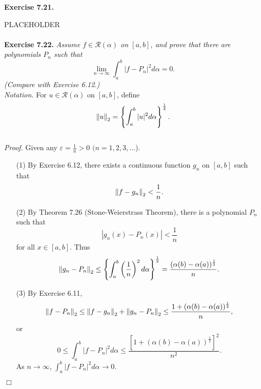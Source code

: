 \documentclass{article}
\begin{document}



\textbf{Exercise 7.21.}

PLACEHOLDER \\\\






\textbf{Exercise 7.22.}
\emph{Assume $f \in \mathscr{R}(\alpha)$ on $[a,b]$,
and prove that there are polynomials $P_n$ such that
\[
  \lim_{n \to \infty} \int_{a}^{b} |f-P_n|^2 d\alpha = 0.
\]
(Compare with Exercise 6.12.)} \\

\emph{Notation.}
For $u \in \mathscr{R}(\alpha)$ on $[a,b]$, define
  \[
    \norm{u}_2 = \left\{ \int_{a}^{b}|u|^2 d\alpha \right\}^{\frac{1}{2}}.
  \] \\

\emph{Proof.}
Given any $\varepsilon = \frac{1}{n} > 0$ $(n=1,2,3,\ldots$).
\begin{enumerate}
\item[(1)]
  By Exercise 6.12, there exists a continuous function $g_n$ on $[a,b]$
  such that
  \[
    \norm{f-g_n}_2 < \frac{1}{n}.
  \]

\item[(2)]
  By Theorem 7.26 (Stone-Weierstrass Theorem),
  there is a polynomial $P_n$ such that
  \[
    |g_n(x)-P_n(x)| < \frac{1}{n}
  \]
  for all $x \in [a,b]$.
  Thus
  \[
    \norm{g_n-P_n}_2
    \leq
    \left\{ \int_{a}^{b}\left(\frac{1}{n}\right)^2 d\alpha \right\}^{\frac{1}{2}}
    =
    \frac{(\alpha(b)-\alpha(a))^{\frac{1}{2}}}{n}.
  \]

\item[(3)]
  By Exercise 6.11,
  \[
    \norm{f-P_n}_2
    \leq
    \norm{f-g_n}_2 + \norm{g_n-P_n}_2
    \leq
    \frac{1+(\alpha(b)-\alpha(a))^{\frac{1}{2}}}{n},
  \]
  or
  \[
    0
    \leq
    \int_{a}^{b} |f-P_n|^2 d\alpha
    \leq
    \frac{[1+(\alpha(b)-\alpha(a))^{\frac{1}{2}}]^2}{n^2}.
  \]
  As $n \to \infty$, $\int_{a}^{b} |f-P_n|^2 d\alpha \to 0$.
\end{enumerate}
$\Box$ \\\\



\end{document}
